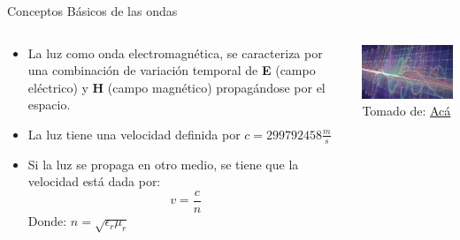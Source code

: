 \documentclass[aspectratio=169]{beamer}
\begin{document}
\begin{frame}{Conceptos Básicos de las ondas}
    \begin{columns}[c, onlytextwidth]
        \begin{column}{0.55\textwidth}
            \begin{itemize}
                \item La luz como onda electromagnética, se caracteriza por una combinación de variación temporal de \textbf{E} (campo eléctrico) y \textbf{H} (campo magnético) propagándose por el espacio.
                \item La luz tiene una velocidad definida  por $c= 299 792 458 \frac{m}{s}$
                \item Si la luz se propaga en otro medio, se tiene que la velocidad está dada por:
                \begin{equation*}
                    v=\frac{c}{n}
                \end{equation*}
                Donde: $n=\sqrt{\epsilon_r \mu_r}$
            \end{itemize}
        \end{column}
        \begin{column}{0.45\textwidth}
            \centering
            \includegraphics[width = 0.8\linewidth]{fig/Optica/ondas.jpg}\\
            \tiny{Tomado de: \href{https://www.viasat.com/es-mx/acerca-de-nosotros/sala-de-prensa/blog/que-son-las-ondas-de-radio-y-como-las-usan-los-satelites/}{Acá}}
        \end{column}
    \end{columns}
\end{frame}
\end{document}
